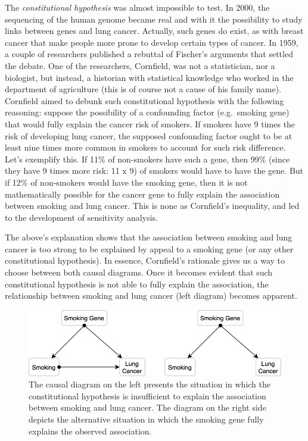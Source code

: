 \documentclass[
]{book}
\begin{document}
The \emph{constitutional hypothesis} was almost impossible to test. In 2000, the sequencing of the human genome became real and with it the possibility to study links between genes and lung cancer. Actually, such genes do exist, as with breast cancer that make people more prone to develop certain types of cancer. In 1959, a couple of researchers published a rebuttal of Fischer's arguments that settled the debate. One of the researchers, Cornfield, was not a statistician, nor a biologist, but instead, a historian with statistical knowledge who worked in the department of agriculture (this is of course not a cause of his family name). Cornfield aimed to debunk such constitutional hypothesis with the following reasoning: suppose the possibility of a confounding factor (e.g.~smoking gene) that would fully explain the cancer risk of smokers. If smokers have 9 times the risk of developing lung cancer, the supposed confounding factor ought to be at least nine times more common in smokers to account for such risk difference. Let's exemplify this. If 11\% of non-smokers have such a gene, then 99\% (since they have 9 times more risk: 11 x 9) of smokers would have to have the gene. But if 12\% of non-smokers would have the smoking gene, then it is not mathematically possible for the cancer gene to fully explain the association between smoking and lung cancer. This is none as Cornfield's inequality, and led to the development of sensitivity analysis.

The above's explanation shows that the association between smoking and lung cancer is too strong to be explained by appeal to a smoking gene (or any other constitutional hypothesis). In essence, Cornfield's rationale gives us a way to choose between both causal diagrams. Once it becomes evident that such constitutional hypothesis is not able to fully explain the association, the relationship between smoking and lung cancer (left diagram) becomes apparent.

\begin{figure}

{\centering \includegraphics[width=0.7\linewidth]{Figures/SmokeDebate_diagram} 

}

\caption{The causal diagram on the left presents the situation in which the constitutional hypothesis is insufficient to explain the association between smoking and lung cancer. The diagram on the right side depicts the alternative situation in which the smoking gene fully explains the observed association.}\label{fig:smoke-debate-dia}
\end{figure}
\end{document}
